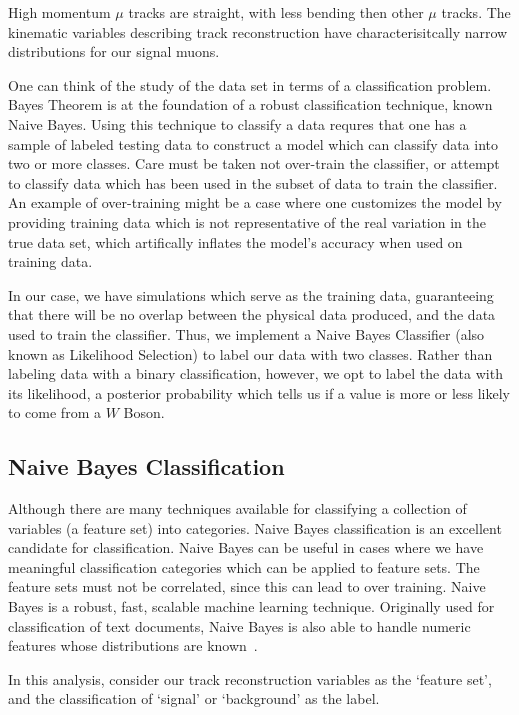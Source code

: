 High momentum $\mu$ tracks are straight, with less bending then other $\mu$
tracks. The kinematic variables describing track reconstruction have
characterisitcally narrow distributions for our signal muons.

One can think of the study of the data set in terms of a classification problem.
Bayes Theorem is at the foundation of a robust classification technique, known
Naive Bayes. Using this technique to classify a data requres that one has a
sample of labeled testing data to construct a model which can classify data into
two or more classes. Care must be taken not over-train the classifier, or
attempt to classify data which has been used in the subset of data to train the
classifier. An example of over-training might be a case where one customizes the
model by providing training data which is not representative of the real
variation in the true data set, which artifically inflates the model's
accuracy when used on training data.

In our case, we have simulations which serve as the training data, guaranteeing
that there will be no overlap between the physical data produced, and the data
used to train the classifier. Thus, we implement a Naive Bayes Classifier (also
known as Likelihood Selection) to label our data with two classes. Rather than
labeling data with a binary classification, however, we opt to label the data
with its likelihood, a posterior probability which tells us if a value is more
or less likely to come from a $W$ Boson.

\subsection{Naive Bayes Classification}

Although there are many techniques available for classifying a collection of
variables (a feature set) into categories. Naive Bayes classification is an
excellent candidate for classification. Naive Bayes can be useful in cases where
we have meaningful classification categories which can be applied to feature
sets. The feature sets must not be correlated, since this can lead to over
training.  Naive Bayes is a robust, fast, scalable machine learning technique.
Originally used for classification of text documents, Naive Bayes is also able
to handle numeric features whose distributions are known~\cite{Collins2013}.

In this analysis, consider our track reconstruction variables as the `feature
set', and the classification of `signal' or `background' as the label.

